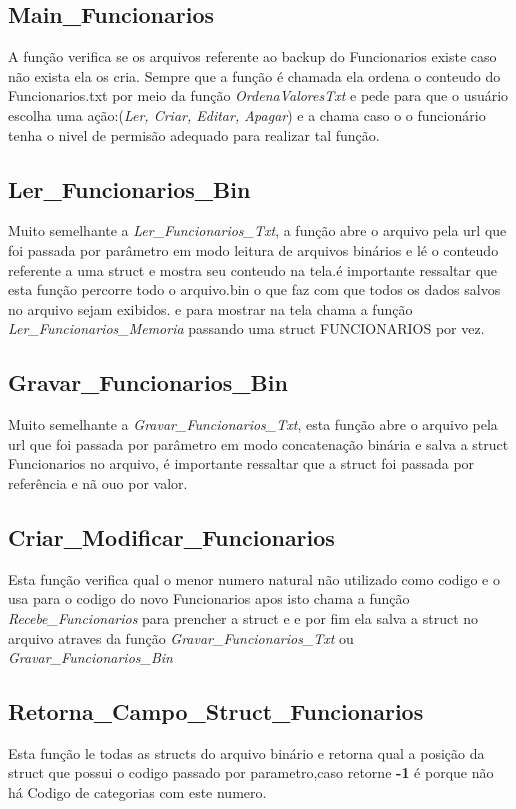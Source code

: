 \documentclass{article}
\begin{document}
\subsection{Main\_Funcionarios}
	A função verifica se os arquivos referente ao backup do Funcionarios existe caso não exista ela os cria. Sempre que a função é chamada ela ordena o conteudo do Funcionarios.txt por meio da função \textit{OrdenaValoresTxt} e pede para que o usuário escolha uma ação:(\textit{Ler, Criar, Editar, Apagar})  e a chama caso o  o funcionário tenha o nivel de permisão adequado para realizar tal função.

\subsection{Ler\_Funcionarios\_Bin}
	Muito semelhante a \textit{Ler\_Funcionarios\_Txt}, a função abre o arquivo pela url que foi passada por parâmetro em modo leitura de arquivos binários e lé o conteudo referente a uma struct e mostra seu conteudo na tela.é importante ressaltar que esta função percorre todo o arquivo.bin o que faz com que todos os dados salvos no arquivo sejam exibidos. e para mostrar na tela chama a função \textit{Ler\_Funcionarios\_Memoria} passando uma struct FUNCIONARIOS  por vez.

\subsection{Gravar\_Funcionarios\_Bin}
	Muito semelhante a \textit{Gravar\_Funcionarios\_Txt}, esta função abre o arquivo pela url que foi passada por parâmetro em modo concatenação binária e salva a struct Funcionarios  no arquivo, é importante ressaltar que  a struct foi passada por referência e nã ouo por valor.

\subsection{Criar\_Modificar\_Funcionarios}
	Esta função verifica qual o menor numero natural não utilizado como codigo e o usa para o codigo do novo Funcionarios apos isto  chama a função \textit{Recebe\_Funcionarios} para prencher a struct e e por fim ela salva a struct no arquivo atraves da função \textit{Gravar\_Funcionarios\_Txt} ou \textit{Gravar\_Funcionarios\_Bin}

\subsection{Retorna\_Campo\_Struct\_Funcionarios}
	Esta função le todas as structs do arquivo binário e retorna qual a posição da struct que possui o codigo passado por parametro,caso retorne \textbf{-1} é porque não há Codigo de categorias com este numero.
\end{document}

